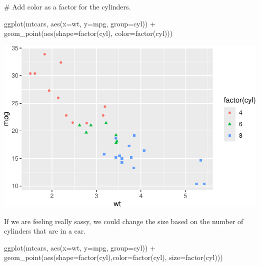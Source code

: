 \documentclass[
  letterpaper,
  DIV=11,
  numbers=noendperiod]{scrreprt}
\newenvironment{Shaded}{\begin{snugshade}}{\end{snugshade}}
\newcommand{\AttributeTok}[1]{\textcolor[rgb]{0.40,0.45,0.13}{#1}}
\newcommand{\CommentTok}[1]{\textcolor[rgb]{0.37,0.37,0.37}{#1}}
\newcommand{\FunctionTok}[1]{\textcolor[rgb]{0.28,0.35,0.67}{#1}}
\newcommand{\NormalTok}[1]{\textcolor[rgb]{0.00,0.23,0.31}{#1}}
\newcommand{\SpecialCharTok}[1]{\textcolor[rgb]{0.37,0.37,0.37}{#1}}
\begin{document}
\begin{Shaded}
\begin{Highlighting}[]
\CommentTok{\# Add color as a factor for the cylinders.}

\FunctionTok{ggplot}\NormalTok{(mtcars, }\FunctionTok{aes}\NormalTok{(}\AttributeTok{x=}\NormalTok{wt, }\AttributeTok{y=}\NormalTok{mpg, }\AttributeTok{group=}\NormalTok{cyl)) }\SpecialCharTok{+}
  \FunctionTok{geom\_point}\NormalTok{(}\FunctionTok{aes}\NormalTok{(}\AttributeTok{shape=}\FunctionTok{factor}\NormalTok{(cyl), }\AttributeTok{color=}\FunctionTok{factor}\NormalTok{(cyl)))}
\end{Highlighting}
\end{Shaded}

\includegraphics{Advanced_Scatterplot_Techniques_files/figure-pdf/unnamed-chunk-10-1.pdf}

If we are feeling really sassy, we could change the size based on the
number of cylinders that are in a car.

\begin{Shaded}
\begin{Highlighting}[]
\FunctionTok{ggplot}\NormalTok{(mtcars, }\FunctionTok{aes}\NormalTok{(}\AttributeTok{x=}\NormalTok{wt, }\AttributeTok{y=}\NormalTok{mpg, }\AttributeTok{group=}\NormalTok{cyl)) }\SpecialCharTok{+}
  \FunctionTok{geom\_point}\NormalTok{(}\FunctionTok{aes}\NormalTok{(}\AttributeTok{shape=}\FunctionTok{factor}\NormalTok{(cyl),}\AttributeTok{color=}\FunctionTok{factor}\NormalTok{(cyl), }\AttributeTok{size=}\FunctionTok{factor}\NormalTok{(cyl)))}
\end{Highlighting}
\end{Shaded}
\end{document}
